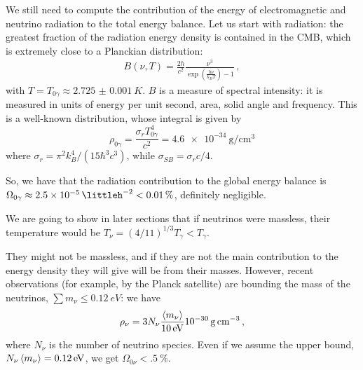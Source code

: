 \documentclass[main.tex]{subfiles}
\begin{document}
We still need to compute the contribution of the energy of electromagnetic and neutrino radiation to the total energy balance.
Let us start with radiation: the greatest fraction of the radiation energy density is contained in the CMB, which is extremely close to a Planckian distribution: 
%
\begin{align}
B (\nu, T) = \frac{2 h}{c^2} \frac{\nu^3}{\exp(\frac{h \nu }{k_B T}) - 1}
\,,
\end{align}
%
with \(T = T_{0 \gamma } \approx \SI{2.725(1)}{K}\). \(B\) is a measure of spectral intensity: it is measured in units of energy per unit second, area, solid angle and frequency. This is a well-known distribution, whose integral is given by
%
\begin{equation}
  \rho_{0 \gamma} = \frac{\sigma_r T_{0 \gamma}^4}{c^2} = \SI{4.6e-34}{\gram\per\centi\metre\cubed}
\end{equation}
%
where \(\sigma_r = \pi^2 k_B^4 / (15 \hbar ^3 c^3)\), while \(\sigma_{SB} = \sigma_r c /4\).


So, we have that the radiation contribution to the global energy balance is \(\Omega_{0 \gamma } \approx \SI{2.5e-5}{\littleh^{-2}} < \SI{.01}{\percent}\), definitely negligible.


We are going to show in later sections
that if neutrinos were massless, their temperature would be \(T_\nu = (4/11)^{1/3} T_\gamma < T_\gamma \).

They might not be massless, and if they are not the main contribution to the energy density they will give will be from their masses.
However, recent observations (for example, by the Planck satellite) are bounding the mass of the neutrinos,
\(\sum m_\nu \leq \SI{0.12}{eV} \): we have 
%
\begin{equation}
\rho_\nu = 3 N_\nu \frac{\expval{m_\nu} }{\SI{10}{eV}} \SI{e-30}{\gram\per\cubic\centi\metre}
\,,
\end{equation}
%
where \(N_{\nu }\) is the number of neutrino species. 
Even if we assume the upper bound, \(N_{\nu } \expval{m_{\nu }} = \SI{.12}{eV}\), we get \(\Omega_{0 \nu } < \SI{.5}{\percent}\). 
\end{document}

